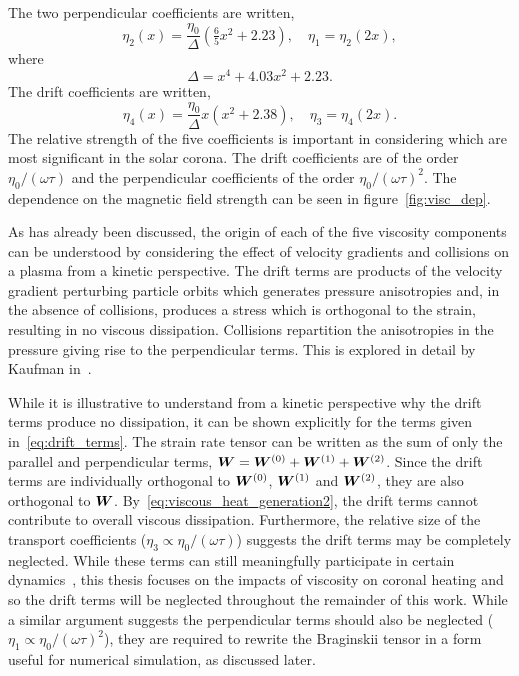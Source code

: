 The two perpendicular coefficients are written,
\begin{equation}
  \label{eq:perp_visc_coeff}
  \eta_2(x) = \frac{\eta_0}{\Delta} \left( \tfrac{6}{5} x^2 + 2.23 \right), \quad \eta_1 = \eta_2(2x),
\end{equation}
where
\begin{equation}
  \label{eq:delta}
\Delta = x^4 + 4.03x^2 + 2.23.
\end{equation}
The drift coefficients are written,
\begin{equation}
  \label{eq:drift_visc_coeff}
  \eta_4(x) = \frac{\eta_0}{\Delta} x \left( x^2 + 2.38 \right), \quad \eta_3 = \eta_4(2x).
\end{equation}
The relative strength of the five coefficients is important in considering which are most significant in the solar corona. The drift coefficients are of the order $\eta_0/(\omega \tau)$ and the perpendicular coefficients of the order $\eta_0/(\omega \tau)^2$. The dependence on the magnetic field strength can be seen in figure~\ref{fig:visc_dep}.

As has already been discussed, the origin of each of the five viscosity components can be understood by considering the effect of velocity gradients and collisions on a plasma from a kinetic perspective. The drift terms are products of the velocity gradient perturbing particle orbits which generates pressure anisotropies and, in the absence of collisions, produces a stress which is orthogonal to the strain, resulting in no viscous dissipation. Collisions repartition the anisotropies in the pressure giving rise to the perpendicular terms. This is explored in detail by Kaufman in~\cite{kaufmanPlasmaViscosityMagnetic1960}. 

While it is illustrative to understand from a kinetic perspective why the drift terms produce no dissipation, it can be shown explicitly for the terms given in~\eqref{eq:drift_terms}. The strain rate tensor can be written as the sum of only the parallel and perpendicular terms, ${\bm W} = {\bm W}^{(0)} + {\bm W}^{(1)} + {\bm W}^{(2)}$. Since the drift terms are individually orthogonal to ${\bm W}^{(0)}$, ${\bm W}^{(1)}$ and ${\bm W}^{(2)}$, they are also orthogonal to ${\bm W}$. By~\eqref{eq:viscous_heat_generation2}, the drift terms cannot contribute to overall viscous dissipation. Furthermore, the relative size of the transport coefficients ($\eta_3 \propto \eta_0/(\omega\tau)$) suggests the drift terms may be completely neglected. While these terms can still meaningfully participate in certain dynamics~\cite{dellarPlanarChannelFlow2011,ferraroFiniteElementImplementation2006}, this thesis focuses on the impacts of viscosity on coronal heating and so the drift terms will be neglected throughout the remainder of this work. While a similar argument suggests the perpendicular terms should also be neglected ($\eta_1 \propto \eta_0/(\omega\tau)^2$), they are required to rewrite the Braginskii tensor in a form useful for numerical simulation, as discussed later.

